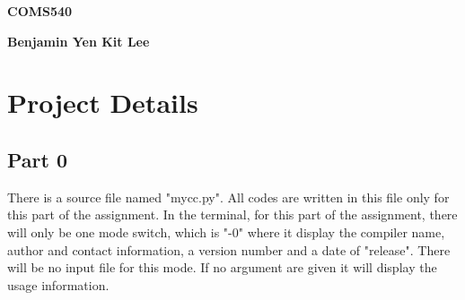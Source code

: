 \documentclass[11pt]{article}
\begin{document}
\vspace{0.3cm}
\begin{center}
\Large
\textbf{COMS540}
\end{center}

\vspace{0.3cm}
\begin{center}
\Large
\textbf{Benjamin Yen Kit Lee}
\end{center}

\section{Project Details}

\subsection{Part 0}
There is a source file named "mycc.py". All codes are written in this file only for this part of the assignment. In the terminal, for this part of the assignment, there will only be one mode switch, which is "-0" where it display the compiler name, author and contact information, a version number and a date of "release". There will be no input file for this mode. If no argument are given it will display the usage information.
\end{document}
